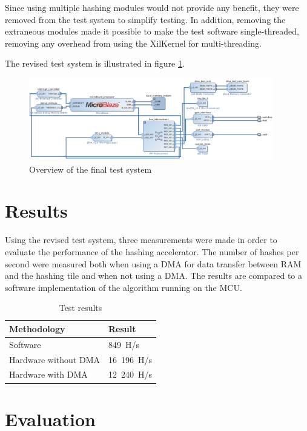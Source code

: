 Since using multiple hashing modules would not provide any benefit, they were removed
from the test system to simplify testing. In addition, removing the extraneous modules
made it possible to make the test software single-threaded, removing any overhead from
using the XilKernel for multi-threading.

The revised test system is illustrated in figure \ref{fig:testsystem-vivado-final}.

\begin{figure}
	\includegraphics[width=0.95\textwidth]{Figures/testsystem-vivado-final.png}
	\caption{Overview of the final test system}
	\label{fig:testsystem-vivado-final}
\end{figure}

\section{Results}

Using the revised test system, three measurements were made in order to evaluate the
performance of the hashing accelerator. The number of hashes per second were measured
both when using a DMA for data transfer between RAM and the hashing tile and when not
using a DMA. The results are compared to a software implementation of the algorithm
running on the MCU.

\begin{table}[ht]
	\centering
	\begin{tabular}{|l|l|}
		\hline
		\textbf{Methodology} & \textbf{Result} \\
		\hline
		Software & 849~H/s \\
		Hardware without DMA & 16~196~H/s\\
		Hardware with DMA & 12~240~H/s\\
		\hline
	\end{tabular}

	\caption{Test results}
\end{table}

\section{Evaluation}

